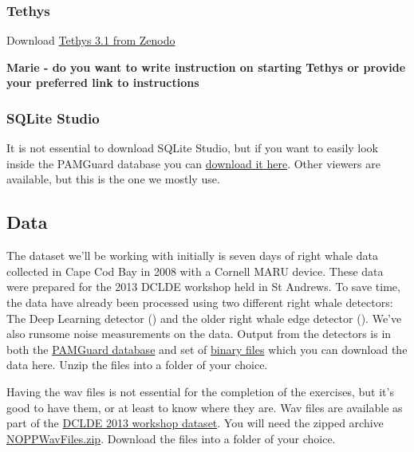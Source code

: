 \documentclass[
]{article}
\begin{document}
\subsubsection{Tethys}\label{tethys}

Download \href{https://zenodo.org/records/13626338}{Tethys 3.1 from
Zenodo}

\textbf{Marie - do you want to write instruction on starting Tethys or
provide your preferred link to instructions}

\subsubsection{SQLite Studio}\label{sqlite-studio}

It is not essential to download SQLite Studio, but if you want to easily
look inside the PAMGuard database you can
\href{https://sqlitestudio.pl/}{download it here}. Other viewers are
available, but this is the one we mostly use.

\subsection{Data}\label{data}

The dataset we'll be working with initially is seven days of right whale
data collected in Cape Cod Bay in 2008 with a Cornell MARU device. These
data were prepared for the 2013 DCLDE workshop held in St Andrews. To
save time, the data have already been processed using two different
right whale detectors: The Deep Learning detector
() and the older right whale
edge detector (). We've also
runsome noise measurements on the data. Output from the detectors is in
both the
\href{https://www.pamguard.org/olhelp/utilities/generalDatabaseHelp/docs/database_database.html}{PAMGuard
database} and set of
\href{https://www.pamguard.org/olhelp/utilities/BinaryStore/docs/binarystore_overview.html}{binary
files} which you can download the data here. Unzip the files into a
folder of your choice.

Having the wav files is not essential for the completion of the
exercises, but it's good to have them, or at least to know where they
are. Wav files are available as part of the
\href{https://doi.org/10.17630/62c3eebc-5574-4ec0-bfef-367ad839fe1a}{DCLDE
2013 workshop dataset}. You will need the zipped archive
\href{https://research-portal.st-andrews.ac.uk/files/264470819/NOPPWavFiles.zip}{NOPPWavFiles.zip}.
Download the files into a folder of your choice.
\end{document}
